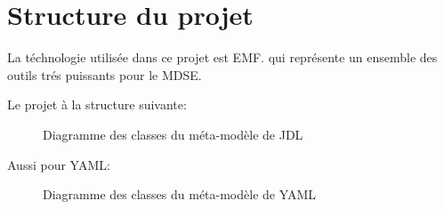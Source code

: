 \section{Structure du projet}

La téchnologie utilisée dans ce projet est EMF. qui représente un
ensemble des outils trés puissants pour le MDSE.

Le projet à la structure suivante:

\begin{figure}[H]
  \begin{center}
      \caption{Diagramme des classes du méta-modèle de JDL}
  \end{center}
\end{figure}

Aussi pour YAML:

\begin{figure}[H]
  \begin{center}
      \caption{Diagramme des classes du méta-modèle de YAML}
  \end{center}
\end{figure}
